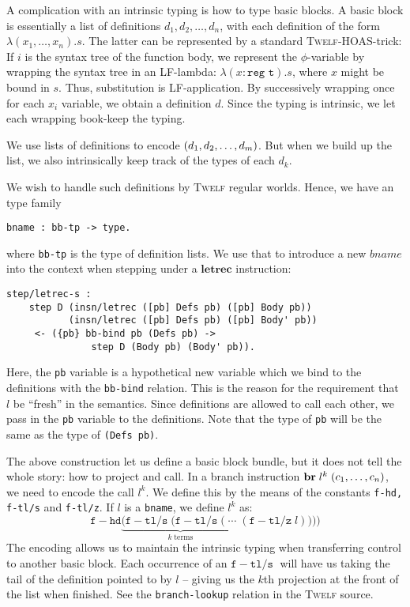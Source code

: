 \documentclass[a4paper, oneside, 10pt, draft]{memoir}
\newcommand{\twelf}{\textsc{Twelf}}
\begin{document}
A complication with an intrinsic typing is how to type basic blocks. A
basic block is essentially a list of definitions $d_1, d_2, \dotsc,
d_n$, with each definition of the form $\lambda (x_1, \dotsc,
x_n).s$. The latter can be represented by a standard \twelf{}-HOAS-trick:
If $i$ is the syntax tree of the function body, we represent the
$\phi$-variable by wrapping the syntax tree in an LF-lambda: $\lambda
(x : \texttt{reg t}) . s$, where $x$ might be bound in $s$. Thus,
substitution is LF-application. By successively wrapping once for each
$x_i$ variable, we obtain a definition $d$. Since the typing is
intrinsic, we let each wrapping book-keep the typing.

We use lists of definitions to encode $(d_1, d_2, \dotsc, d_m)$. But when we build up
the list, we also intrinsically keep track of the types of each $d_k$.

We wish to handle such definitions by \twelf{} regular worlds. Hence,
we have an type family
\begin{verbatim}
bname : bb-tp -> type.
\end{verbatim}
where \texttt{bb-tp} is the type of definition lists. We use that to
introduce a new $bname$ into the context when stepping under a
$\mathbf{letrec}$ instruction:
\begin{verbatim}
step/letrec-s :
    step D (insn/letrec ([pb] Defs pb) ([pb] Body pb))
           (insn/letrec ([pb] Defs pb) ([pb] Body' pb))
     <- ({pb} bb-bind pb (Defs pb) ->
               step D (Body pb) (Body' pb)).
\end{verbatim}
Here, the \texttt{pb} variable is a hypothetical new variable which we
bind to the definitions with the \texttt{bb-bind} relation. This is
the reason for the requirement that $l$ be ``fresh'' in the
semantics. Since definitions are allowed to call each other, we pass
in the \texttt{pb} variable to the definitions. Note that the type of
\texttt{pb} will be the same as the type of \texttt{(Defs pb)}.

The above construction let us define a basic block bundle, but it does
not tell the whole story: how to project and call. In a branch
instruction $\mathbf{br} \; l^k \; (c_1, \dotsc, c_n)$, we need to encode the
call $l^k$. We define this by the means of the constants
\texttt{f-hd, f-tl/s} and \texttt{f-tl/z}. If $l$ is a
\texttt{bname}, we define $l^k$ as:
\newcommand{\fhd}{\mathtt{f\!\!-\!\!hd}}
\newcommand{\ftls}{\mathtt{f\!\!-\!\!tl/s}\; }
\newcommand{\ftlz}[1]{(\mathtt{f\!\!-\!\!tl/z} \; #1)}
\begin{equation*}
  \fhd \underbrace{(\ftls(\ftls ( \; \dotsb \; }_{k \; \text{terms}}\ftlz{l})))
\end{equation*}
The encoding allows us to maintain the intrinsic typing when transferring
control to another basic block. Each occurrence of an $\ftls$ will
have us taking the tail of the definition pointed to by $l$ -- giving
us the $k$th projection at the front of the list when finished. See
the \texttt{branch-lookup} relation in the \twelf{} source.
\end{document}
